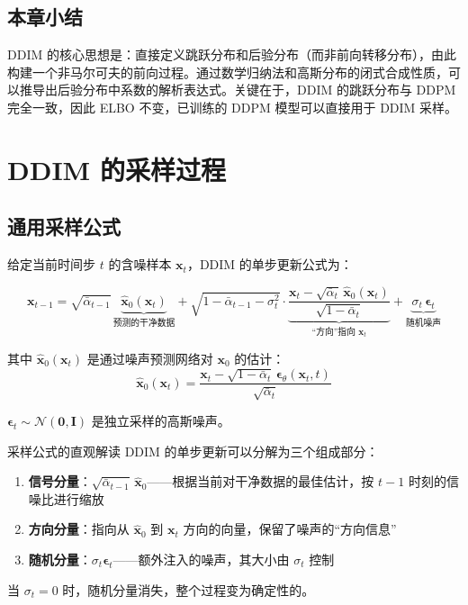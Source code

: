\documentclass[a4paper]{article}
\begin{document}
\subsection{本章小结}

DDIM 的核心思想是：直接定义跳跃分布和后验分布（而非前向转移分布），由此构建一个非马尔可夫的前向过程。通过数学归纳法和高斯分布的闭式合成性质，可以推导出后验分布中系数的解析表达式。关键在于，DDIM 的跳跃分布与 DDPM 完全一致，因此 ELBO 不变，已训练的 DDPM 模型可以直接用于 DDIM 采样。


\section{DDIM 的采样过程}

\subsection{通用采样公式}

给定当前时间步 $t$ 的含噪样本 $\mathbf{x}_t$，DDIM 的单步更新公式为：

$$
\mathbf{x}_{t-1} = \sqrt{\bar{\alpha}_{t-1}}\,\underbrace{\hat{\mathbf{x}}_0(\mathbf{x}_t)}_{\text{预测的干净数据}} + \sqrt{1-\bar{\alpha}_{t-1}-\sigma_t^2}\cdot\underbrace{\frac{\mathbf{x}_t - \sqrt{\bar{\alpha}_t}\,\hat{\mathbf{x}}_0(\mathbf{x}_t)}{\sqrt{1-\bar{\alpha}_t}}}_{\text{``方向''指向 } \mathbf{x}_t} + \underbrace{\sigma_t\,\boldsymbol{\epsilon}_t}_{\text{随机噪声}}
$$

其中 $\hat{\mathbf{x}}_0(\mathbf{x}_t)$ 是通过噪声预测网络对 $\mathbf{x}_0$ 的估计：
$$
\hat{\mathbf{x}}_0(\mathbf{x}_t) = \frac{\mathbf{x}_t - \sqrt{1-\bar{\alpha}_t}\,\boldsymbol{\epsilon}_\theta(\mathbf{x}_t, t)}{\sqrt{\bar{\alpha}_t}}
$$

$\boldsymbol{\epsilon}_t \sim \mathcal{N}(\mathbf{0}, \mathbf{I})$ 是独立采样的高斯噪声。

\begin{importantbox}{采样公式的直观解读}
DDIM 的单步更新可以分解为三个组成部分：
\begin{enumerate}
    \item \textbf{信号分量}：$\sqrt{\bar{\alpha}_{t-1}}\,\hat{\mathbf{x}}_0$——根据当前对干净数据的最佳估计，按 $t-1$ 时刻的信噪比进行缩放
    \item \textbf{方向分量}：指向从 $\hat{\mathbf{x}}_0$ 到 $\mathbf{x}_t$ 方向的向量，保留了噪声的``方向信息''
    \item \textbf{随机分量}：$\sigma_t \boldsymbol{\epsilon}_t$——额外注入的噪声，其大小由 $\sigma_t$ 控制
\end{enumerate}
当 $\sigma_t=0$ 时，随机分量消失，整个过程变为确定性的。
\end{importantbox}
\end{document}
